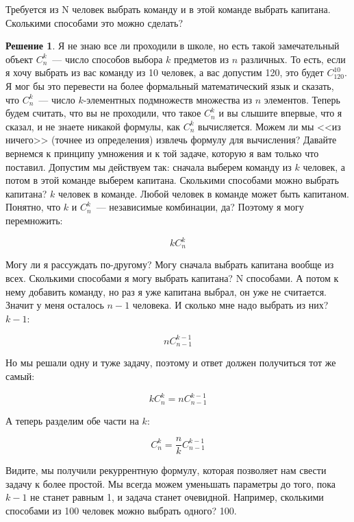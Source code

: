 \documentclass[russian]{lecture-notes}
\theoremstyle{definition}
\newtheorem*{solution}{Решение}
\begin{document}
\begin{enumerate}
		\begin{problem}
			Требуется из N человек выбрать команду и в этой команде выбрать капитана. Сколькими способами это можно сделать?
		\end{problem}
	
		\begin{solution}
			 Я не знаю все ли проходили в школе, но есть такой замечательный объект $C_n^k$~--- число способов выбора $k$ предметов из $n$ различных. То есть, если я хочу выбрать из вас команду из 10 человек, а вас допустим 120, это будет $C_{120}^{10}$. Я мог бы это перевести на более формальный математический язык и сказать, что $C_n^k$~--- число $k$-элементных подмножеств множества из $n$ элементов. Теперь будем считать, что вы не проходили, что такое $C_n^k$ и вы слышите впервые, что я сказал, и не знаете никакой формулы, как $C_n^k$ вычисляется. Можем ли мы <<из ничего>> (точнее из определения) извлечь формулу для вычисления? Давайте вернемся к принципу умножения и к той задаче, которую я вам только что поставил. Допустим мы действуем так: сначала выберем команду из $k$ человек, а потом в этой команде выберем капитана. Сколькими способами можно выбрать капитана? $k$ человек в команде. Любой человек в команде может быть капитаном. Понятно, что $k$ и $C_n^k$~--- независимые комбинации, да? Поэтому я могу перемножить:
			 
			 \[
			 	kC_n^k
			 \]
			 
			 Могу ли я рассуждать по-другому? Могу сначала выбрать капитана вообще из всех. Сколькими способами я могу выбрать капитана? N способами. А потом к нему добавить команду, но раз я уже капитана выбрал, он уже не считается. Значит у меня осталось $n-1$ человека. И сколько мне надо выбрать из них? $k-1$:
			 
			 \[
			 	nC_{n-1}^{k-1}
			 \]
			 
			 Но мы решали одну и туже задачу, поэтому и ответ должен получиться тот же самый:
			 
			 \[
			 	kC_n^k = nC_{n-1}^{k-1}
			 \]
			 
			 А теперь разделим обе части на $k$:
			 
			 \[
			 	C_n^k = \frac{n}{k}C_{n-1}^{k-1}
			 \]
			 
			 Видите, мы получили рекуррентную формулу, которая позволяет нам свести задачу к более простой. Мы всегда можем уменьшать параметры до того, пока $k-1$ не станет равным 1, и задача станет очевидной. Например, сколькими способами из 100 человек можно выбрать одного? 100. 
			 

\end{solution}
\end{enumerate}
\end{document}

